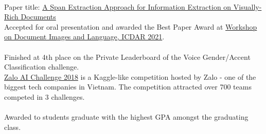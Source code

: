 \\
Paper title: \href{https://aps.arxiv.org/abs/2106.00978}{A Span Extraction Approach for Information Extraction on Visually-Rich Documents}\\
\indent Accepted for oral presentation and awarded the Best Paper Award at \href{https://dil2021.github.io/index.html}{Workshop on Document Images and Language, ICDAR 2021}.\\

\\
Finished at 4th place on the Private Leaderboard of the Voice Gender/Accent Classification challenge.\\
\indent \href{https://challenge.zalo.ai}{Zalo AI Challenge 2018} is a Kaggle-like competition hosted by Zalo - one of the biggest tech companies in Vietnam. The competition attracted over 700 teams competed in 3 challenges.\\

\\
Awarded to students graduate with the highest GPA amongst the graduating class.\\